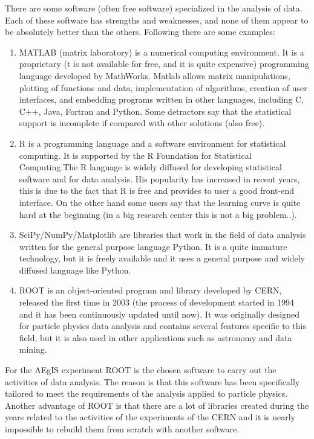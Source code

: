 There are some software (often free software) specialized in the analysis of data. Each of these software has strengths and weaknesses, and none of them appear to be absolutely better than the others. Following there are some examples:
 
\begin{enumerate}

\item MATLAB (matrix laboratory) is a numerical computing environment. It is a proprietary (t is not available for free, and it is quite expensive) programming language developed by MathWorks. Matlab allows matrix manipulations, plotting of functions and data, implementation of algorithms, creation of user interfaces, and embedding programs written in other languages, including C, C++, Java, Fortran and Python. 
Some detractors say that the statistical support is incomplete if compared with other solutions (also free).

\item R is a programming language and a software environment for statistical computing. It is supported by the R Foundation for Statistical Computing.The R language is widely diffused for developing statistical software and for data analysis. His popularity has increased in recent years, this is due to the fact that R is free and provides to user a good front-end interface. On the other hand some users say that the learning curve is quite hard at the beginning (in a big research center this is not a big problem..).  

\item SciPy/NumPy/Matplotlib are libraries that work in the field of data analysis written for the general purpose language Python. It is a quite immature technology, but it is freely available and it uses a general purpose and widely diffused language like Python.

\item ROOT is an object-oriented program and library developed by CERN, released the first time in 2003 (the process of development started in 1994 and it has been continuously updated until now). It was originally designed for particle physics data analysis and contains several features specific to this field, but it is also used in other applications such as astronomy and data mining. 

\end{enumerate}

For the AEgIS experiment ROOT is the chosen software to carry out the activities of data analysis. The reason is that this software has been specifically tailored to meet the requirements of the analysis applied to particle physics.
Another advantage of ROOT is that there are a lot of libraries created during the years related to the activities of the experiments of the CERN and it is nearly impossible to rebuild them from scratch with another software.

